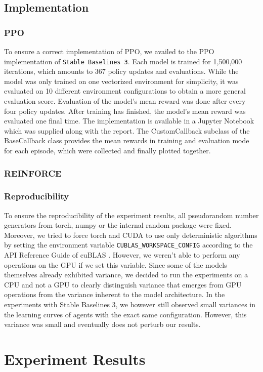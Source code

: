 \documentclass[a4paper, 11pt]{article}
\begin{document}
	\subsection{Implementation}
	\subsubsection{PPO}
	To ensure a correct implementation of PPO, we availed to the PPO implementation of \texttt{Stable Baselines 3}. 
	Each model is trained for 1,500,000 iterations, which amounts to 367 policy updates and evaluations. While the model was only trained on one vectorized environment for simplicity, it was evaluated on 10 different environment configurations to obtain a more general evaluation score. Evaluation of the model's mean reward was done after every four policy updates. After training has finished, the model's mean reward was evaluated one final time.
	The implementation is available in a Jupyter Notebook which was supplied along with the report.
	The CustomCallback subclass of the BaseCallback class provides the mean rewards in training and evaluation mode for each episode, which were collected and finally plotted together.
	\subsubsection{REINFORCE}
	\subsubsection{Reproducibility}
	To ensure the reproducibility of the experiment results, all pseudorandom number generators from torch, numpy or the internal random package were fixed. Moreover, we tried to force torch and CUDA to use only deterministic algorithms by setting the environment variable \texttt{CUBLAS\_WORKSPACE\_CONFIG} according to the API Reference Guide of cuBLAS \cite{Nvid.CUDA}. However, we weren't able to perform any operations on the GPU if we set this variable. 
	Since some of the models themselves already exhibited variance, we decided to run the experiments on a CPU and not a GPU to clearly distinguish variance that emerges from GPU operations from the variance inherent to the model architecture.
	In the experiments with Stable Baselines 3, we however still observed small variances in the learning curves of agents with the exact same configuration. However, this variance was small and eventually does not perturb our results.
	\section{Experiment Results}
\end{document}
